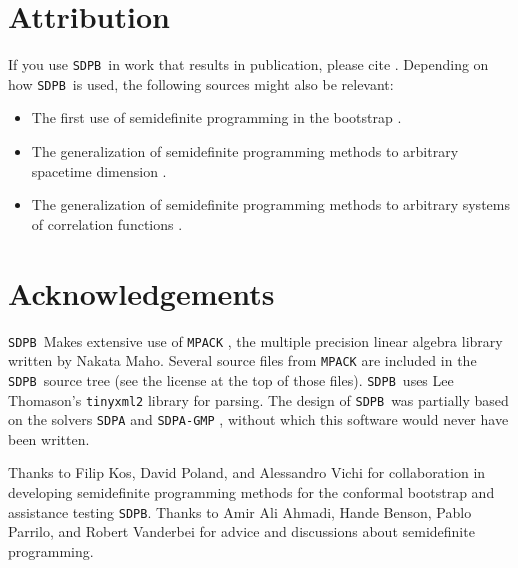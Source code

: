 \documentclass[12pt]{article}
\numberwithin{equation}{section}
\newcommand\SDPB{\texttt{SDPB}}
\begin{document}
\section{Attribution}

If you use \SDPB\ in work that results in publication, please cite \cite{DSD}. Depending on how \SDPB\ is used, the following sources might also be relevant:
\begin{itemize}
\item The first use of semidefinite programming in the bootstrap \cite{Poland:2011ey}.
\item The generalization of semidefinite programming methods to arbitrary
spacetime dimension \cite{Kos:2013tga}.
\item The generalization of semidefinite programming methods to arbitrary
systems of correlation functions \cite{Kos:2014bka}.
\end{itemize}

\section{Acknowledgements}

\SDPB\ Makes extensive use of \texttt{MPACK} \cite{MPACK}, the multiple precision linear algebra library written by Nakata Maho.  Several source files from \texttt{MPACK} are included in the \SDPB\ source tree (see the license at the top of those files). \SDPB\ uses Lee Thomason's \texttt{tinyxml2} library \cite{TINYXML2} for parsing.
The design of \SDPB\ was partially based on the solvers \texttt{SDPA} and \texttt{SDPA-GMP} \cite{SDPA,SDPA2,SDPAGMP}, without which this software would never have been written.

Thanks to Filip Kos, David Poland, and Alessandro Vichi for collaboration in developing semidefinite programming methods for the conformal bootstrap and assistance testing \SDPB.  Thanks to Amir Ali Ahmadi, Hande Benson, Pablo Parrilo, and Robert Vanderbei for advice and discussions about semidefinite programming.
\end{document}
